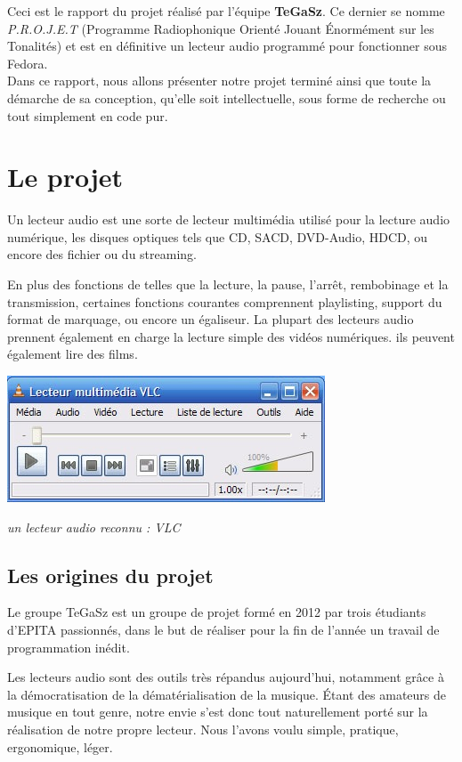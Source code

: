 \documentclass[12pt,a4paper]{report}
\begin{document}
Ceci est le rapport du projet réalisé par l'équipe \textbf{TeGaSz}. 
Ce dernier se nomme \emph{P.R.O.J.E.T} (Programme Radiophonique Orienté Jouant Énormément sur les Tonalités) et est en définitive un lecteur audio programmé pour fonctionner sous Fedora. \\
Dans ce rapport, nous allons présenter notre projet terminé ainsi
que toute la démarche de sa conception, qu'elle soit intellectuelle, sous forme de 
recherche ou tout simplement en code pur.

\chapter{Le projet}
Un lecteur audio est une sorte de lecteur multimédia utilisé pour la lecture audio numérique, les disques optiques tels que CD, SACD, DVD-Audio, HDCD, ou encore  des fichier ou du streaming.

En plus des fonctions de telles que la lecture, la pause, l'arrêt, rembobinage et la transmission, certaines fonctions courantes comprennent playlisting, support du format de marquage, ou encore un égaliseur.
La plupart des lecteurs audio prennent également en charge la lecture simple des vidéos numériques. ils peuvent également lire des films.

\begin{center}
\includegraphics{vlc-interface1.jpg}

\it{un lecteur audio reconnu : VLC}
\end{center}

\section{Les origines du projet}

Le groupe TeGaSz est un groupe de projet formé en 2012 par trois étudiants
d'EPITA passionnés, dans le but de réaliser pour la fin de l'année un
travail de programmation inédit. 

Les lecteurs audio sont des outils très répandus aujourd'hui, notamment grâce à la démocratisation de la dématérialisation de la musique. Étant des amateurs de musique en tout genre, notre envie s'est donc tout naturellement porté sur la réalisation de notre propre lecteur. Nous l'avons voulu simple, pratique, ergonomique, léger.
\end{document}
